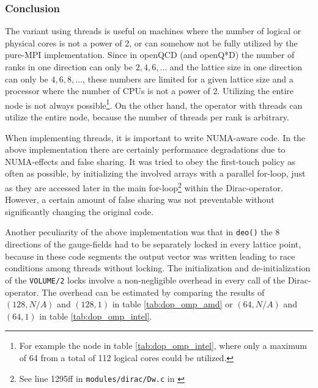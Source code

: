 \documentclass{article}
\theoremstyle{plain} %
\theoremstyle{convention} %
\theoremstyle{remark} %
\def\code#1{\texttt{#1}}
\numberwithin{equation}{section}
\begin{document}
\subsubsection{Conclusion}

The variant using threads is useful on machines where the number of logical or physical cores is not a power of \num{2}, or can somehow not be fully utilized by the pure-MPI implementation. Since in openQCD (and openQ*D) the number of ranks in one direction can only be $2,4,6,\dots$ and the lattice size in one direction can only be $4,6,8,\dots$, these numbers are limited for a given lattice size and a processor where the number of CPUs is not a power of \num{2}. Utilizing the entire node is not always possible\footnote{For example the node in table \ref{tab:dop_omp_intel}, where only a maximum of \num{64} from a total of \num{112} logical cores could be utilized.}. On the other hand, the operator with threads can utilize the entire node, because the number of threads per rank is arbitrary.

When implementing threads, it is important to write NUMA-aware code. In the above implementation there are certainly performance degradations due to NUMA-effects and false sharing. It was tried to obey the first-touch policy as often as possible, by initializing the involved arrays with a parallel for-loop, just as they are accessed later in the main for-loop\footnote{See line 1295ff in \code{modules/dirac/Dw.c} in \cite{openqcd_threads}} within the Dirac-operator. However, a certain amount of false sharing was not preventable without significantly changing the original code.

Another peculiarity of the above implementation was that in \code{deo()} the \num{8} directions of the gauge-fields had to be separately locked in every lattice point, because in these code segments the output vector was written leading to race conditions among threads without locking. The initialization and de-initialization of the \code{VOLUME/2} locks involve a non-negligible overhead in every call of the Dirac-operator. The overhead can be estimated by comparing the results of $(128, N/A)$ and $(128, 1)$ in table \ref{tab:dop_omp_amd} or $(64, N/A)$ and $(64, 1)$ in table \ref{tab:dop_omp_intel}.
\end{document}

